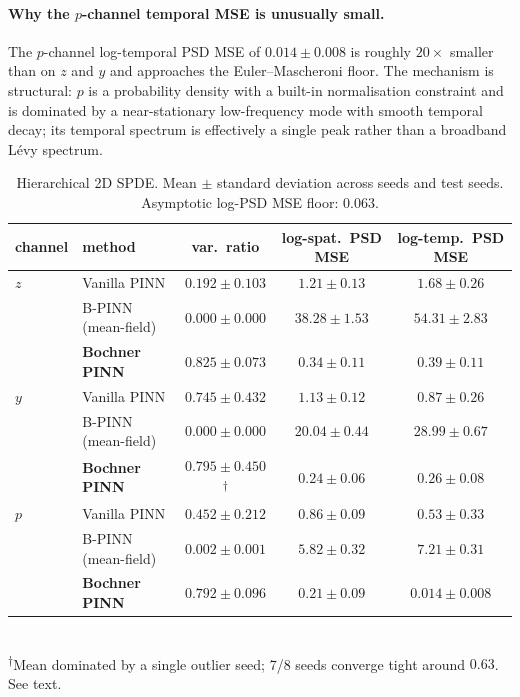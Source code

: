 \documentclass[10pt]{elsarticle}
\begin{document}
\paragraph{Why the $p$-channel temporal MSE is unusually small.}
The $p$-channel log-temporal PSD MSE of \(0.014 \pm 0.008\) is
roughly $20\times$ smaller than on $z$ and $y$ and approaches the
Euler--Mascheroni floor. The mechanism is structural: $p$ is a
probability density with a built-in normalisation constraint and
is dominated by a near-stationary low-frequency mode with smooth
temporal decay; its temporal spectrum is effectively a single peak
rather than a broadband L\'evy spectrum.

\begin{table}[h]
\centering
\caption{Hierarchical 2D SPDE. Mean \(\pm\) standard deviation
across seeds and test seeds. Asymptotic log-PSD MSE floor: 0.063.}
\label{tab:hier}
\begin{tabular}{l l c c c}
\toprule
channel & method & var.\ ratio & log-spat.\ PSD MSE & log-temp.\ PSD MSE \\
\midrule
\(z\) & Vanilla PINN     & \(0.192 \pm 0.103\) & \(1.21 \pm 0.13\) & \(1.68 \pm 0.26\) \\
   & B-PINN (mean-field)  & \(0.000 \pm 0.000\) & \(38.28 \pm 1.53\) & \(54.31 \pm 2.83\) \\
   & \textbf{Bochner PINN} & \(\mathbf{0.825 \pm 0.073}\) & \(\mathbf{0.34 \pm 0.11}\) & \(\mathbf{0.39 \pm 0.11}\) \\
\midrule
\(y\) & Vanilla PINN     & \(0.745 \pm 0.432\) & \(1.13 \pm 0.12\) & \(0.87 \pm 0.26\) \\
   & B-PINN (mean-field)  & \(0.000 \pm 0.000\) & \(20.04 \pm 0.44\) & \(28.99 \pm 0.67\) \\
   & \textbf{Bochner PINN} & \(0.795 \pm 0.450\)\textsuperscript{$\dagger$}
                & \(\mathbf{0.24 \pm 0.06}\)
                & \(\mathbf{0.26 \pm 0.08}\) \\
\midrule
\(p\) & Vanilla PINN     & \(0.452 \pm 0.212\) & \(0.86 \pm 0.09\) & \(0.53 \pm 0.33\) \\
   & B-PINN (mean-field)  & \(0.002 \pm 0.001\) & \(5.82 \pm 0.32\) & \(7.21 \pm 0.31\) \\
   & \textbf{Bochner PINN} & \(\mathbf{0.792 \pm 0.096}\)
                & \(\mathbf{0.21 \pm 0.09}\)
                & \(\mathbf{0.014 \pm 0.008}\) \\
\bottomrule
\end{tabular}\\[4pt]
\textsuperscript{$\dagger$}Mean dominated by a single outlier
seed; 7/8 seeds converge tight around $0.63$. See text.
\end{table}
\end{document}
